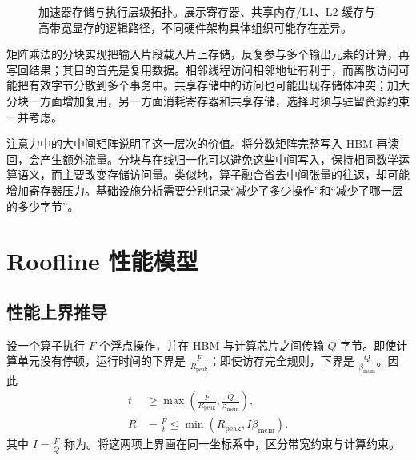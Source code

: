 \documentclass[../textbook.tex]{subfiles}
\begin{document}
\begin{figure}[htbp]
\centering
{}
\caption[加速器存储与执行层级拓扑]{加速器存储与执行层级拓扑。展示寄存器、共享内存/L1、L2 缓存与高带宽显存的逻辑路径，不同硬件架构具体组织可能存在差异。}\label{fig:infra-gpu}
\end{figure}

矩阵乘法的分块实现把输入片段载入片上存储，反复参与多个输出元素的计算，再写回结果；其目的首先是复用数据。相邻线程访问相邻地址有利于，而离散访问可能把有效字节分散到多个事务中。共享存储中的访问也可能出现存储体冲突；加大分块一方面增加复用，另一方面消耗寄存器和共享存储，选择时须与驻留资源约束一并考虑。

注意力中的大中间矩阵说明了这一层次的价值。将分数矩阵完整写入 HBM 再读回，会产生额外流量。分块与在线归一化可以避免这些中间写入，保持相同数学运算语义，而主要改变存储访问量。类似地，算子融合省去中间张量的往返，却可能增加寄存器压力。基础设施分析需要分别记录“减少了多少操作”和“减少了哪一层的多少字节”。

\section{Roofline 性能模型}

\subsection{性能上界推导}
设一个算子执行 $F$ 个浮点操作，并在 HBM 与计算芯片之间传输 $Q$ 字节。即使计算单元没有停顿，运行时间的下界是 $\frac{F}{R_{\mathrm{peak}}}$；即使访存完全规则，下界是 $\frac{Q}{\beta_{\mathrm{mem}}}$。因此
\begin{equation}\label{eq:infra-roofline}
 \begin{aligned}
  t &\geq \max\left(\frac{F}{R_{\mathrm{peak}}},\frac{Q}{\beta_{\mathrm{mem}}}\right), \\
  R &= \frac{F}{t}\leq\min(R_{\mathrm{peak}},I\beta_{\mathrm{mem}}).
 \end{aligned}
\end{equation}
其中 $I=\frac{F}{Q}$ 称为。将这两项上界画在同一坐标系中，区分带宽约束与计算约束。\cite{williams2009roofline}
\end{document}
